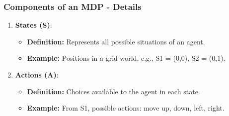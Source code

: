 \documentclass{beamer}
\begin{document}
\begin{frame}[fragile]
    \frametitle{Components of an MDP - Details}
    \begin{enumerate}
        \item \textbf{States (S)}:
            \begin{itemize}
                \item \textbf{Definition:} Represents all possible situations of an agent.
                \item \textbf{Example:} Positions in a grid world, e.g., S1 = (0,0), S2 = (0,1).
            \end{itemize}
        
        \item \textbf{Actions (A)}:
            \begin{itemize}
                \item \textbf{Definition:} Choices available to the agent in each state.
                \item \textbf{Example:} From S1, possible actions: move up, down, left, right.
            \end{itemize}
    \end{enumerate}
\end{frame}
\end{document}
